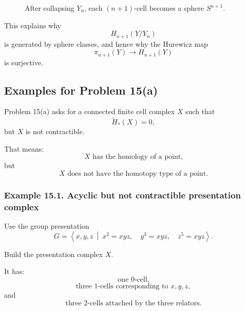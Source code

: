 \documentclass[12pt,a4paper]{article}
\theoremstyle{notespace}
\begin{document}
\begin{figure}[htbp]
	\centering
	\caption{After collapsing \(Y_n\), each \((n+1)\)-cell becomes a sphere \(S^{n+1}\).}
\end{figure}

This explains why
\[
H_{n+1}(Y/Y_n)
\]
is generated by sphere classes, and hence why the Hurewicz map
\[
\pi_{n+1}(Y)\to H_{n+1}(Y)
\]
is surjective.

\subsection{Examples for Problem 15(a)}

Problem 15(a) asks for a connected finite cell complex \(X\) such that
\[
\widetilde H_*(X)=0,
\]
but \(X\) is not contractible.

That means:
\[
X \text{ has the homology of a point,}
\]
but
\[
X \text{ does not have the homotopy type of a point.}
\]

\subsubsection*{Example 15.1. Acyclic but not contractible presentation complex}

Use the group presentation
\[
G=
\left\langle
x,y,z
\ \middle|\
x^2=xyz,\quad
y^3=xyz,\quad
z^5=xyz
\right\rangle.
\]

Build the presentation complex \(X\).

It has:
\[
\text{one \(0\)-cell,}
\]
\[
\text{three \(1\)-cells corresponding to }x,y,z,
\]
and
\[
\text{three \(2\)-cells attached by the three relators.}
\]
\end{document}
